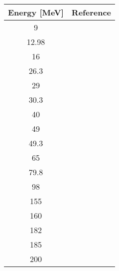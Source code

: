 \begin{tabular}{c c} 
    \toprule 
    \bf{Energy [MeV]} & \bf{Reference} \\
    \midrule
    9 & \cite{Kretschmer79}\\
    12.98 & \cite{Rathmell72}\\
    16 & \cite{VarnerPhDThesis}\\
    26.3 & \cite{VanOers74, Watson67}\\
    29 & \cite{Craig64}\\
    30.3 & \cite{VanOers74, Greenlees70}\\
    40 & \cite{Blumberg66}\\
    49 & \cite{Craig66}\\
    49.3 & \cite{Mani71}\\
    65 & \cite{Sakaguchi82}\\
    79.8 & \cite{Schwandt82}\\
    98 & \cite{Schwandt82}\\
    155 & \cite{Willis68}\\
    160 & \cite{Nadasen81, Schwandt82}\\
    182 & \cite{Nadasen81, Schwandt82}\\
    185 & \cite{VanOers74}\\
    200 & \cite{Lee88}\\
    \bottomrule
\end{tabular}
